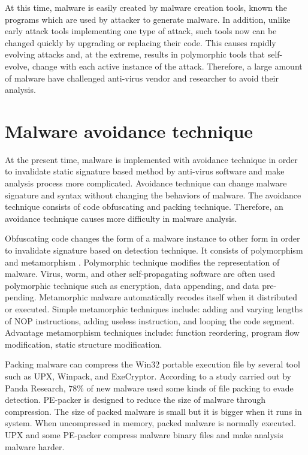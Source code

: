 At this time, malware is easily created by malware creation tools, known the programs which are used by attacker to generate malware\cite{Microsoft}. In addition, unlike early attack tools implementing one type of attack, such tools now can be changed quickly by upgrading or replacing their code. This causes rapidly evolving attacks and, at the extreme, results in polymorphic tools that self-evolve, change with each active instance of the attack. Therefore, a large amount of malware have challenged anti-virus vendor and researcher to avoid their analysis.

\section{Malware avoidance technique}

At the present time, malware is implemented with avoidance technique in order to invalidate static signature based method by anti-virus software and make analysis process more complicated. Avoidance technique can change malware signature and syntax without changing the behaviors of malware. The avoidance technique consists of code obfuscating and packing technique. Therefore, an avoidance technique causes more difficulty in malware analysis. 
 
Obfuscating code changes the form of a malware instance to other form in order to invalidate signature based on detection technique. It consists of polymorphism and metamorphism \cite{blackhat1}. Polymorphic technique modifies the representation of malware. Virus, worm, and other self-propagating software are often used polymorphic technique such as encryption, data appending, and data pre-pending.  Metamorphic malware automatically recodes itself when it distributed or executed\cite{blackhat1}. Simple metamorphic techniques include: adding and varying lengths of NOP instructions, adding useless instruction, and looping the code segment. Advantage metamorphism techniques include: function reordering, program flow modification, static structure modification.

Packing malware can compress the Win32 portable execution file by several tool such as UPX, Winpack, and ExeCryptor. According to a study carried out by Panda Research, $78$\% of new malware used some kinds of file packing to evade detection. PE-packer is designed to reduce the size of malware through compression. The size of packed malware is small but it is bigger when it runs in system\cite{packing}. When uncompressed in memory, packed malware is normally executed. UPX and some PE-packer compress malware binary files and make analysis malware harder.

